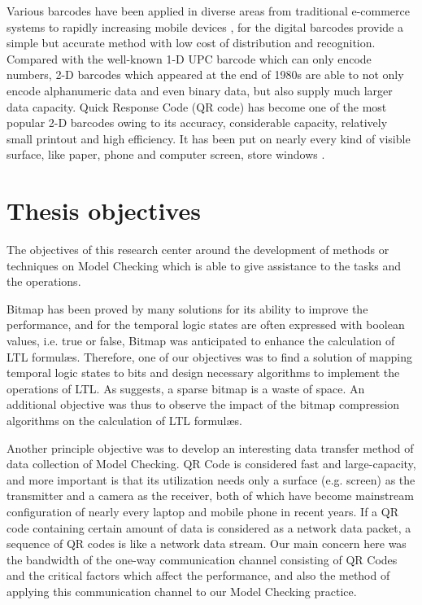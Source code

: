Various barcodes have been applied in diverse areas from traditional e-commerce systems to rapidly increasing mobile devices \citep{gao2007understanding}, for the digital barcodes provide a simple but accurate method with low cost of distribution and recognition. Compared with the well-known 1-D UPC barcode which can only encode numbers, 2-D barcodes which appeared at the end of 1980s are able to not only encode alphanumeric data and even binary data, but also supply much larger data capacity. Quick Response Code (QR code) \citep{qrcode-about} has become one of the most popular 2-D barcodes owing to its accuracy, considerable capacity, relatively small printout and high efficiency. It has been put on nearly every kind of visible surface, like paper, phone and computer screen, store windows \citep{okazaki2012benchmarking}.

\section{Thesis objectives}

The objectives of this research center around the development of methods or techniques on Model Checking which is able to give assistance to the tasks and the operations.

Bitmap has been proved by many solutions for its ability to improve the performance, and for the temporal logic states are often expressed with boolean values, i.e. true or false, Bitmap was anticipated to enhance the calculation of LTL formul\ae{}s. Therefore, one of our objectives was to find a solution of mapping temporal logic states to bits and design necessary algorithms to implement the operations of LTL. As \cite{lemire2014} suggests, a sparse bitmap is a waste of space. An additional objective was thus to observe the impact of the bitmap compression algorithms on the calculation of LTL formul\ae{}s.

Another principle objective was to develop an interesting data transfer method of data collection of Model Checking. QR Code is considered fast and large-capacity, and more important is that its utilization needs only a surface (e.g. screen) as the transmitter and a camera as the receiver, both of which have become mainstream configuration of nearly every laptop and mobile phone in recent years. If a QR code containing certain amount of data is considered as a network data packet, a sequence of QR codes is like a network data stream. Our main concern here was the bandwidth of the one-way communication channel consisting of QR Codes and the critical factors which affect the performance, and also the method of applying this communication channel to our Model Checking practice.

